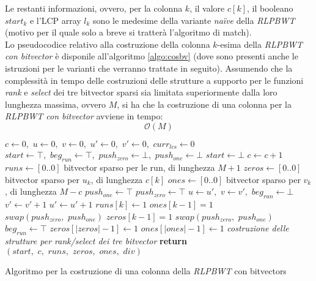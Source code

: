 Le restanti informazioni, ovvero, per la colonna $k$, il valore $c[k]$, il
booleano $start_k$ e l'LCP array $l_k$ sono le medesime della variante
\textit{na\"{i}ve} della \textit{RLPBWT} (motivo per il quale solo a breve si
tratterà l'algoritmo di match).\\
Lo pseudocodice relativo alla costruzione della colonna $k$-esima della
\textit{RLPBWT con bitvector} è disponile all'algoritmo \ref{algo:cosbv} (dove
sono presenti anche le istruzioni per le varianti che verranno trattate in
seguito). Assumendo che la complessità in tempo delle costruzioni delle
strutture a supporto per le funzioni \textit{rank} e \textit{select} dei tre
bitvector sparsi sia limitata superiormente dalla loro lunghezza massima, ovvero
$M$, si ha che la costruzione di una colonna per la \textit{RLPBWT con
  bitvector} avviene in tempo:
\begin{equation}
  \label{eq:bvcos}
  \mathcal{O}(M)
\end{equation}
\begin{algorithm}
  \small
  \begin{algorithmic}[1]
    \State $c\gets 0,\,\,u\gets 0,\,\,v\gets 0,\,\,u'\gets 0,\,\, v'\gets
    0,\,\,curr_{lcs}\gets 0$
    \State $start \gets \top,\,\,beg_{run}\gets \top,\,\,push_{zero}\gets
    \bot,\,\,push_{one}\gets \bot$
    \For {\textit{every} $k\in\left[0,\,\, M\right)$}
    \State $start \gets \bot$
    \EndIf
    \State $c\gets c+1$
    \EndIf
    \EndFor
    \State $runs\gets[0..0]$
    \Comment bitvector sparso per le run, di lunghezza $M+1$
    \State $zeros\gets[0..0]$
    \Comment bitvector sparso per $u_k$, di lunghezza $c[k]$
    \State $ones\gets[0..0]$
    \Comment bitvector sparso per $v_k$, di lunghezza $M-c$
    \State $push_{one}\gets \top$
    \Else
    \State $push_{zero}\gets \top$
    \EndIf
    \For {\textit{every} $k\in\left[0,\,\, M\right)$}
    \State $u\gets u',\,\,v\gets v',\,\,beg_{run}\gets \bot$
    \EndIf
    \State $v'\gets v'+1$
    \Else
    \State $u'\gets u'+1$
    \EndIf
    \State $runs[k]\gets 1$
    \State $ones[k-1]=1$
    \EndIf
    \State $swap(push_{zero},\,\,push_{one})$
    \Else
    \State $zeros[k-1]=1$
    \EndIf
    \State $swap(push_{zero},\,\,push_{one})$
    \EndIf
    \State $beg_{run}\gets \top$
    \EndIf
    \EndFor
    \State $zeros[|zeros|-1]\gets 1$
    \EndIf
    \State $ones[|ones|-1]\gets 1$
    \EndIf
    \State \textit{costruzione delle strutture per rank/select dei tre
    bitvector} 
    \State \textbf{return}
    $(start,\,\,c,\,\,runs,\,\,zeros,\,\,ones,\,\,div)$  
    \EndFunction
  \end{algorithmic}
  \caption{{\footnotesize{Algoritmo per la costruzione di una colonna della
  \textit{RLPBWT} con bitvectors}}}
  \label{algo:cosbv}
\end{algorithm}

